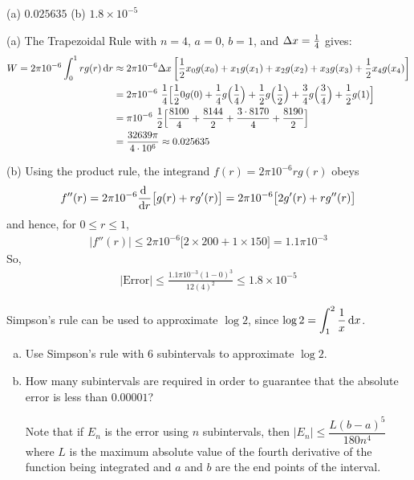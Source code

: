 \begin{answer}
(a) $0.025635$
\qquad (b) $1.8\times 10^{-5}$
\end{answer}

\begin{solution}
(a)
 The Trapezoidal Rule with $n=4$, $a=0$, $b=1$, and $\Delta x = \frac{1}{4}$ gives:
\begin{align*}
W=2\pi 10^{-6}\int_0^1 rg(r)\,\mathrm{d}r
&\approx 2\pi 10^{-6}\Delta x\left[\frac{1}{2}x_0g(x_0)+x_1g(x_1)+x_2g(x_2)+x_3g(x_3)+ \frac{1}{2}x_4g(x_4)\right]\\
&=2\pi 10^{-6}\ \frac{1}{4}
\Big[\frac{1}{2} 0g(0)+\frac{1}{4}g\Big(\frac{1}{4}\Big)
+\frac{1}{2}g\Big(\frac{1}{2}\Big)+\frac{3}{4}g\Big(\frac{3}{4}\Big)
+\frac{1}{2} g(1)\Big] \\
&=\pi 10^{-6}\ \frac{1}{2}
\Big[\frac{8100}{4}
+\frac{8144}{2}+\frac{3\cdot 8170}{4}
+\frac{8190}{2} \Big] \\
& = \frac{32639\pi}{4\cdot 10^6}\approx 0.025635
\end{align*}

\noindent (b)
Using the product rule, the integrand $f(r)=2\pi 10^{-6} rg(r)$ obeys
\begin{align*}
f''(r)=2\pi 10^{-6} \diff{}{r}\big[g(r)+ rg'(r)\big]
=2\pi 10^{-6} \big[2g'(r)+ rg''(r)\big]
\end{align*}
and hence, for $0\le r\le 1$,
\begin{align*}
\big|f''(r)\big|\le 2\pi 10^{-6} \big[2\times200 + 1\times 150\big]
=1.1\pi 10^{-3}
\end{align*}
So,
\begin{align*}
|\text{Error}|\le \frac{1.1\pi 10^{-3}(1-0)^3}{12(4)^2}
\le1.8\times 10^{-5}
\end{align*}
\end{solution}


\begin{Mquestion}[1997A]
Simpson's rule can be used to approximate $\log 2$,
since $\displaystyle\log 2=\int_1^2\frac{1}{x}\,\mathrm{d}x$.
\begin{enumerate}[(a)]
\item
Use Simpson's rule with 6 subintervals to approximate $\log 2$.
\item
How many subintervals are required in order to guarantee
that the absolute error is less than $0.00001$?

\noindent  Note that if $E_n$ is the error using $n$ subintervals, then
$|E_n|\le\dfrac{L(b-a)^5}{180n^4}$ where $L$ is the maximum absolute value
of the fourth derivative of the function being integrated and $a$ and $b$
are the end points of the interval.
\end{enumerate}
\end{Mquestion}

